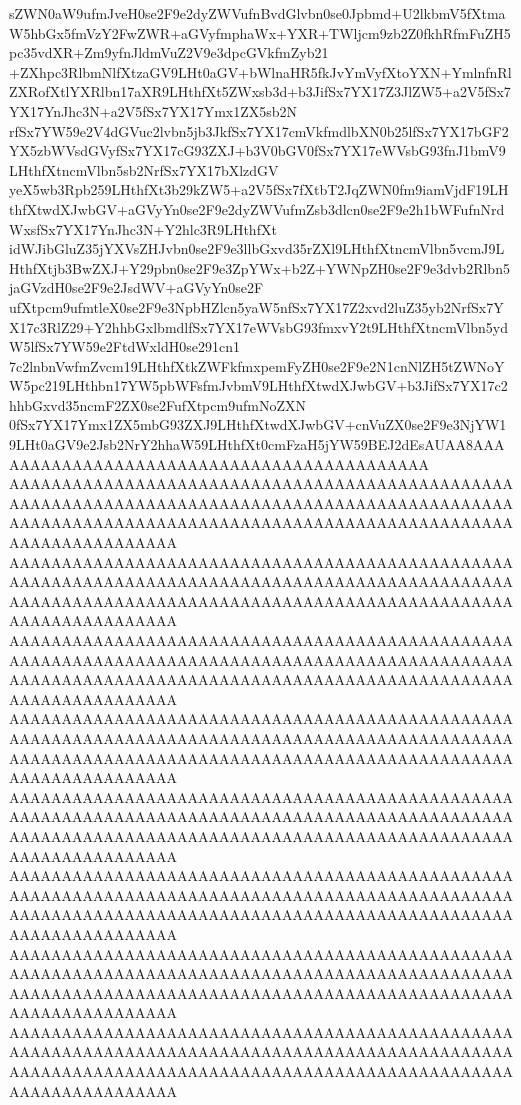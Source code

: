 \documentclass[multi=frame]{standalone}
\begin{document}
\begin{world}
        sZWN0aW9ufmJveH0se2F9e2dyZWVufnBvdGlvbn0se0Jpbmd+U2lkbmV5fXtmaW5hbGx5fmVzY2FwZWR+aGVyfmphaWx+YXR+TWljcm9zb2Z0fkhRfmFuZH5pc35vdXR+Zm9yfnJldmVuZ2V9e3dpcGVkfmZyb21
        +ZXhpc3RlbmNlfXtzaGV9LHt0aGV+bWlnaHR5fkJvYmVyfXtoYXN+YmlnfnRlZXRofXtlYXRlbn17aXR9LHthfXt5ZWxsb3d+b3JifSx7YX17Z3JlZW5+a2V5fSx7YX17YnJhc3N+a2V5fSx7YX17Ymx1ZX5sb2N
        rfSx7YW59e2V4dGVuc2lvbn5jb3JkfSx7YX17cmVkfmdlbXN0b25lfSx7YX17bGF2YX5zbWVsdGVyfSx7YX17cG93ZXJ+b3V0bGV0fSx7YX17eWVsbG93fnJ1bmV9LHthfXtncmVlbn5sb2NrfSx7YX17bXlzdGV
        yeX5wb3Rpb259LHthfXt3b29kZW5+a2V5fSx7fXtbT2JqZWN0fm9iamVjdF19LHthfXtwdXJwbGV+aGVyYn0se2F9e2dyZWVufmZsb3dlcn0se2F9e2h1bWFufnNrdWxsfSx7YX17YnJhc3N+Y2hlc3R9LHthfXt
        idWJibGluZ35jYXVsZHJvbn0se2F9e3llbGxvd35rZXl9LHthfXtncmVlbn5vcmJ9LHthfXtjb3BwZXJ+Y29pbn0se2F9e3ZpYWx+b2Z+YWNpZH0se2F9e3dvb2Rlbn5jaGVzdH0se2F9e2JsdWV+aGVyYn0se2F
        ufXtpcm9ufmtleX0se2F9e3NpbHZlcn5yaW5nfSx7YX17Z2xvd2luZ35yb2NrfSx7YX17c3RlZ29+Y2hhbGxlbmdlfSx7YX17eWVsbG93fmxvY2t9LHthfXtncmVlbn5ydW5lfSx7YW59e2FtdWxldH0se291cn1
        7c2lnbnVwfmZvcm19LHthfXtkZWFkfmxpemFyZH0se2F9e2N1cnNlZH5tZWNoYW5pc219LHthbn17YW5pbWFsfmJvbmV9LHthfXtwdXJwbGV+b3JifSx7YX17c2hhbGxvd35ncmF2ZX0se2FufXtpcm9ufmNoZXN
        0fSx7YX17Ymx1ZX5mbG93ZXJ9LHthfXtwdXJwbGV+cnVuZX0se2F9e3NjYW19LHt0aGV9e2Jsb2NrY2hhaW59LHthfXt0cmFzaH5jYW59BEJ2dEsAUAA8AAAAAAAAAAAAAAAAAAAAAAAAAAAAAAAAAAAAAAAAAAA
        AAAAAAAAAAAAAAAAAAAAAAAAAAAAAAAAAAAAAAAAAAAAAAAAAAAAAAAAAAAAAAAAAAAAAAAAAAAAAAAAAAAAAAAAAAAAAAAAAAAAAAAAAAAAAAAAAAAAAAAAAAAAAAAAAAAAAAAAAAAAAAAAAAAAAAAAAAAAAAAA
        AAAAAAAAAAAAAAAAAAAAAAAAAAAAAAAAAAAAAAAAAAAAAAAAAAAAAAAAAAAAAAAAAAAAAAAAAAAAAAAAAAAAAAAAAAAAAAAAAAAAAAAAAAAAAAAAAAAAAAAAAAAAAAAAAAAAAAAAAAAAAAAAAAAAAAAAAAAAAAAA
        AAAAAAAAAAAAAAAAAAAAAAAAAAAAAAAAAAAAAAAAAAAAAAAAAAAAAAAAAAAAAAAAAAAAAAAAAAAAAAAAAAAAAAAAAAAAAAAAAAAAAAAAAAAAAAAAAAAAAAAAAAAAAAAAAAAAAAAAAAAAAAAAAAAAAAAAAAAAAAAA
        AAAAAAAAAAAAAAAAAAAAAAAAAAAAAAAAAAAAAAAAAAAAAAAAAAAAAAAAAAAAAAAAAAAAAAAAAAAAAAAAAAAAAAAAAAAAAAAAAAAAAAAAAAAAAAAAAAAAAAAAAAAAAAAAAAAAAAAAAAAAAAAAAAAAAAAAAAAAAAAA
        AAAAAAAAAAAAAAAAAAAAAAAAAAAAAAAAAAAAAAAAAAAAAAAAAAAAAAAAAAAAAAAAAAAAAAAAAAAAAAAAAAAAAAAAAAAAAAAAAAAAAAAAAAAAAAAAAAAAAAAAAAAAAAAAAAAAAAAAAAAAAAAAAAAAAAAAAAAAAAAA
        AAAAAAAAAAAAAAAAAAAAAAAAAAAAAAAAAAAAAAAAAAAAAAAAAAAAAAAAAAAAAAAAAAAAAAAAAAAAAAAAAAAAAAAAAAAAAAAAAAAAAAAAAAAAAAAAAAAAAAAAAAAAAAAAAAAAAAAAAAAAAAAAAAAAAAAAAAAAAAAA
        AAAAAAAAAAAAAAAAAAAAAAAAAAAAAAAAAAAAAAAAAAAAAAAAAAAAAAAAAAAAAAAAAAAAAAAAAAAAAAAAAAAAAAAAAAAAAAAAAAAAAAAAAAAAAAAAAAAAAAAAAAAAAAAAAAAAAAAAAAAAAAAAAAAAAAAAAAAAAAAA
        AAAAAAAAAAAAAAAAAAAAAAAAAAAAAAAAAAAAAAAAAAAAAAAAAAAAAAAAAAAAAAAAAAAAAAAAAAAAAAAAAAAAAAAAAAAAAAAAAAAAAAAAAAAAAAAAAAAAAAAAAAAAAAAAAAAAAAAAAAAAAAAAAAAAAAAAAAAAAAAA

\end{world}
\end{document}
